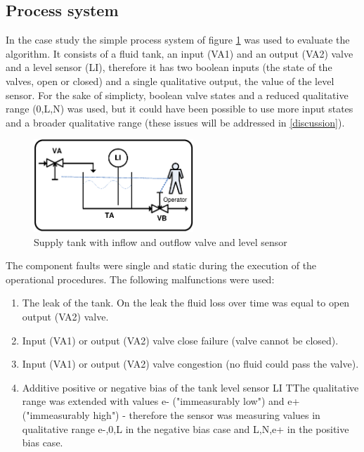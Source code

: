 \documentclass[conference]{IEEEtran}
\begin{document}
\subsection{Process system}

In the case study the simple process system of figure \ref{fig:tank} was used to evaluate the algorithm. It consists of a fluid tank, an input (VA1) and an output (VA2) valve and a level sensor (LI), therefore it has two boolean inputs (the state of the valves, open or closed) and a single qualitative output, the value of the level sensor. For the sake of simplicty, boolean valve states and a reduced qualitative range ({0,L,N}) was used, but it could have been possible to use more input states and a broader qualitative range (these issues will be addressed in \ref{discussion}). 

\begin{figure}[h!]
 \begin{center}
  \includegraphics[width=6cm]{Stank.eps}
  \caption {Supply tank with inflow and outflow valve and level sensor}
  \label{fig:tank}
 \end{center}
\end{figure} 

The component faults were single and static during the execution of the operational procedures. The following malfunctions were used:
\begin{enumerate}
\item The leak of the tank. On the leak the fluid loss over time was equal to open output (VA2) valve.
\item Input (VA1) or output (VA2) valve close failure (valve cannot be closed).
\item Input (VA1) or output (VA2) valve congestion (no fluid could pass the valve).
\item Additive positive or negative bias of the tank level sensor LI TThe qualitative range was extended with values e- ("immeasurably low") and e+("immeasurably high") - therefore the sensor was measuring values in qualitative range {e-,0,L} in the negative bias case and {L,N,e+} in the positive bias case.
\end{enumerate}
\end{document}
